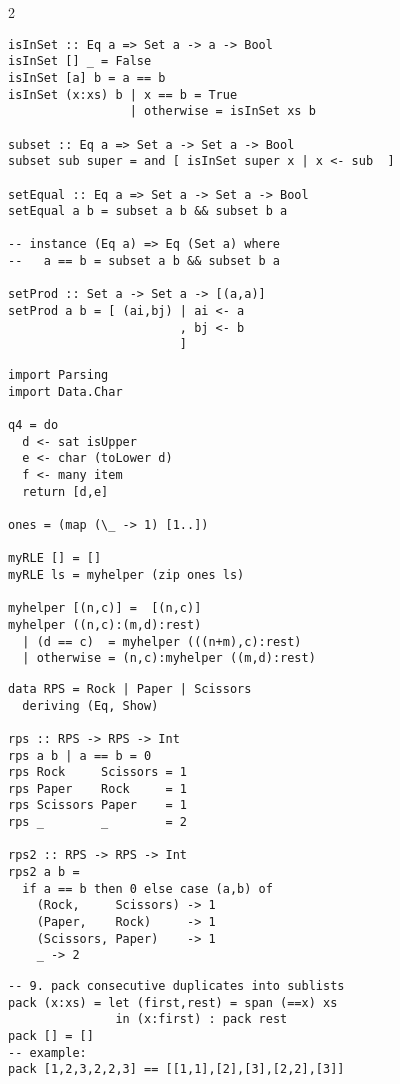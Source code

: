 \documentclass{article}
\def \columncount {2}
\begin{document}
\begin{multicols*}{\columncount}
\begin{outline}[longenum]
\begin{verbatim}
isInSet :: Eq a => Set a -> a -> Bool
isInSet [] _ = False
isInSet [a] b = a == b
isInSet (x:xs) b | x == b = True
                 | otherwise = isInSet xs b

subset :: Eq a => Set a -> Set a -> Bool
subset sub super = and [ isInSet super x | x <- sub  ]

setEqual :: Eq a => Set a -> Set a -> Bool
setEqual a b = subset a b && subset b a

-- instance (Eq a) => Eq (Set a) where
--   a == b = subset a b && subset b a

setProd :: Set a -> Set a -> [(a,a)]
setProd a b = [ (ai,bj) | ai <- a
                        , bj <- b
                        ]

\end{verbatim}


\begin{verbatim}
import Parsing
import Data.Char

q4 = do 
  d <- sat isUpper
  e <- char (toLower d)
  f <- many item
  return [d,e]

ones = (map (\_ -> 1) [1..])

myRLE [] = []
myRLE ls = myhelper (zip ones ls)

myhelper [(n,c)] =  [(n,c)] 
myhelper ((n,c):(m,d):rest)
  | (d == c)  = myhelper (((n+m),c):rest)
  | otherwise = (n,c):myhelper ((m,d):rest)
\end{verbatim}

\begin{verbatim}
data RPS = Rock | Paper | Scissors
  deriving (Eq, Show)

rps :: RPS -> RPS -> Int
rps a b | a == b = 0
rps Rock     Scissors = 1
rps Paper    Rock     = 1
rps Scissors Paper    = 1
rps _        _        = 2

rps2 :: RPS -> RPS -> Int
rps2 a b =
  if a == b then 0 else case (a,b) of
    (Rock,     Scissors) -> 1
    (Paper,    Rock)     -> 1
    (Scissors, Paper)    -> 1
    _ -> 2

\end{verbatim}

\begin{verbatim}
-- 9. pack consecutive duplicates into sublists
pack (x:xs) = let (first,rest) = span (==x) xs
               in (x:first) : pack rest
pack [] = []
-- example:
pack [1,2,3,2,2,3] == [[1,1],[2],[3],[2,2],[3]]
\end{verbatim}


\begin{verbatim}
\end{verbatim}

\end{outline}
\end{multicols*}
\end{document}
